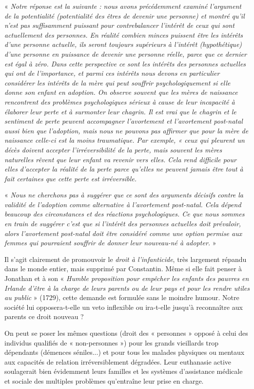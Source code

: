 « \emph{Notre réponse est la suivante : nous avons précédemment examiné l'argument de la potentialité (potentialité des êtres de devenir une personne) et montré qu'il n'est pas suffisamment puissant pour contrebalancer l'intérêt de ceux qui sont actuellement des personnes. En réalité combien minces puissent être les intérêts d'une personne actuelle, ils seront toujours supérieurs à l'intérêt (hypothétique) d'une personne en puissance de devenir une personne réelle, parce que ce dernier est égal à zéro. Dans cette perspective ce sont les intérêts des personnes actuelles qui ont de l'importance, et parmi ces intérêts nous devons en particulier considérer les intérêts de la mère qui peut souffrir psychologiquement si elle donne son enfant en adoption. On observe souvent que les mères de naissance rencontrent des problèmes psychologiques sérieux à cause de leur incapacité à élaborer leur perte et à surmonter leur chagrin. Il est vrai que le chagrin et le sentiment de perte peuvent accompagner l'avortement et l'avortement post-natal aussi bien que l'adoption, mais nous ne pouvons pas affirmer que pour la mère de naissance celle-ci est la moins traumatique. Par exemple, « ceux qui pleurent un décès doivent accepter l'irréversibilité de la perte, mais souvent les mères naturelles rêvent que leur enfant va revenir vers elles. Cela rend difficile pour elles d'accepter la réalité de la perte parce qu'elles ne peuvent jamais être tout à fait certaines que cette perte est irréversible.}

« \emph{Nous ne cherchons pas à suggérer que ce sont des arguments décisifs contre la validité de l'adoption comme alternative à l'avortement post-natal. Cela dépend beaucoup des circonstances et des réactions psychologiques. Ce que nous sommes en train de suggérer c'est que si l'intérêt des personnes actuelles doit prévaloir, alors l'avortement post-natal doit être considéré comme une option permise aux femmes qui pourraient souffrir de donner leur nouveau-né à adopter.} »

 Il s'agit clairement de promouvoir le \emph{droit à l'infanticide}, très largement répandu dans le monde entier, mais supprimé par Constantin. Même si elle fait penser à Jonathan  et à son « \emph{Humble proposition pour empêcher les enfants des pauvres en Irlande d'être à la charge de leurs parents ou de leur pays et pour les rendre utiles au public} » (1729), cette demande est formulée sans le moindre humour. Notre société lui opposera-t-elle un veto inflexible ou ira-t-elle jusqu'à reconnaître aux parents ce droit nouveau ? 

 On peut se poser les mêmes questions (droit des « personnes » opposé à celui des individus qualifiés de « non-personnes ») pour les grands vieillards trop dépendants (démences séniles...) et pour tous les malades physiques ou mentaux aux capacités de relation irréversiblement dégradées. Leur euthanasie active soulagerait bien évidemment leurs familles et les systèmes d'assistance médicale et sociale des multiples problèmes qu'entraîne leur prise en charge.
 
 
